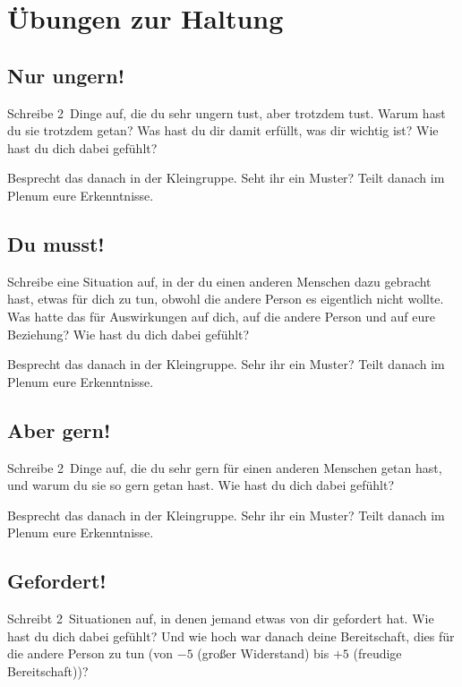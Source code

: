 \label{gfk-übungen}

\section{Übungen zur Haltung}


\subsection{Nur ungern!}

Schreibe 2~Dinge auf, die du sehr ungern tust, aber trotzdem tust. Warum hast du sie trotzdem getan? Was hast du dir damit erfüllt, was dir wichtig ist? Wie hast du dich dabei gefühlt?

Besprecht das danach in der Kleingruppe. Seht ihr ein Muster? Teilt danach im Plenum eure Erkenntnisse.


\subsection{Du musst!}

Schreibe eine Situation auf, in der du einen anderen Menschen dazu gebracht hast, etwas für dich zu tun, obwohl die andere Person es eigentlich nicht wollte. Was hatte das für Auswirkungen auf dich, auf die andere Person und auf eure Beziehung? Wie hast du dich dabei gefühlt?

Besprecht das danach in der Kleingruppe. Sehr ihr ein Muster? Teilt danach im Plenum eure Erkenntnisse.


\subsection{Aber gern!}

Schreibe 2~Dinge auf, die du sehr gern für einen anderen Menschen getan hast, und warum du sie so gern getan hast. Wie hast du dich dabei gefühlt?

Besprecht das danach in der Kleingruppe. Sehr ihr ein Muster? Teilt danach im Plenum eure Erkenntnisse.


\subsection{Gefordert!}

Schreibt 2~Situationen auf, in denen jemand etwas von dir gefordert hat. Wie hast du dich dabei gefühlt? Und wie hoch war danach deine Bereitschaft, dies für die andere Person zu tun (von $-5$ (großer Widerstand) bis $+5$ (freudige Bereitschaft))?

